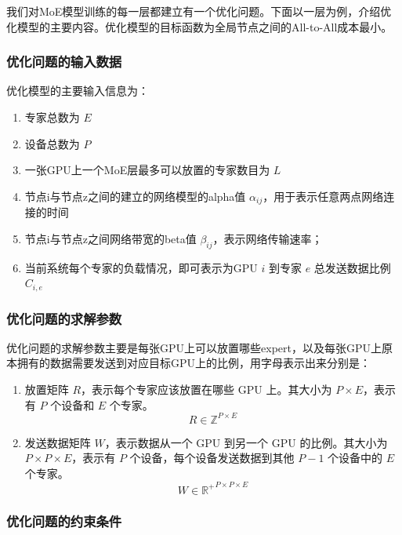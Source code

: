 我们对MoE模型训练的每一层都建立有一个优化问题。下面以一层为例，介绍优化模型的主要内容。优化模型的目标函数为全局节点之间的All-to-All成本最小。

\subsubsection{优化问题的输入数据}

优化模型的主要输入信息为：

\begin{enumerate}
    \item 专家总数为 $E$

    \item 设备总数为 $P$
    
    \item 一张GPU上一个MoE层最多可以放置的专家数目为 $L$
    
    \item 节点i与节点z之间的建立的网络模型的alpha值 $\alpha_{ij}$，用于表示任意两点网络连接的时间
    
    \item 节点i与节点z之间网络带宽的beta值 $\beta_{ij}$，表示网络传输速率；
    
    \item 当前系统每个专家的负载情况，即可表示为GPU $i$ 到专家 $e$ 总发送数据比例$C_{i,e}$
\end{enumerate}

\subsubsection{优化问题的求解参数}

优化问题的求解参数主要是每张GPU上可以放置哪些expert，以及每张GPU上原本拥有的数据需要发送到对应目标GPU上的比例，用字母表示出来分别是：
\begin{enumerate}
    \item 放置矩阵 $R$，表示每个专家应该放置在哪些 GPU 上。其大小为 $P \times E$，表示有 $P$ 个设备和 $E$ 个专家。
    $$R \in \mathbb{Z}^{P \times E}$$

    \item 发送数据矩阵 $W$，表示数据从一个 GPU 到另一个 GPU 的比例。其大小为 $P \times P \times E$，表示有 $P$ 个设备，每个设备发送数据到其他 $P-1$ 个设备中的 $E$ 个专家。
    $$W \in \mathbb{R^{+}}^{P \times P \times E}$$
\end{enumerate}

\subsubsection{优化问题的约束条件}

